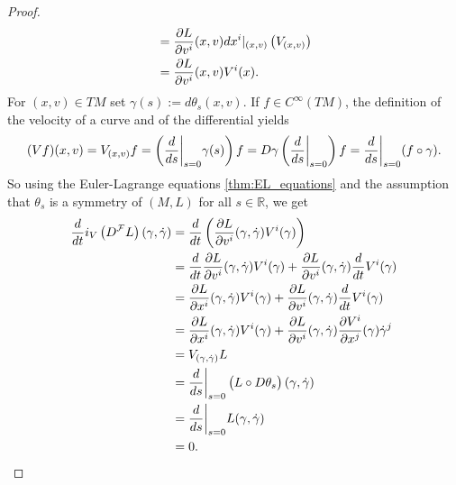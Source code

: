 \begin{proof}
\begin{align*}
		&= \frac{\partial L}{\partial v^i}(x,v)dx^i\vert_{(x,v)}\del[1]{V_{(x,v)}}\\
		&= \frac{\partial L}{\partial v^i}(x,v) V^i(x).
	\end{align*}
	For $(x,v) \in TM$ set $\gamma(s) := d\theta_s(x,v)$. If $f \in C^\infty(TM)$, the definition of the velocity of a curve and of the differential yields
	\begin{equation*}
		(Vf)(x,v) = V_{(x,v)}f = \del[3]{\frac{d}{ds}\bigg\vert_{s = 0}\gamma(s)}f= D\gamma\del[3]{\frac{d}{ds}\bigg\vert_{s = 0}}f = \frac{d}{ds}\bigg\vert_{s = 0}(f \circ \gamma).
	\end{equation*}
	So using the Euler-Lagrange equations \ref{thm:EL_equations} and the assumption that $\theta_s$ is a symmetry of $(M,L)$ for all $s \in \mathbb{R}$, we get
	\begin{align*}
		\frac{d}{dt}i_V\del[1]{D^\mathcal{F}L}(\gamma,\dot{\gamma}) &= \frac{d}{dt}\del[3]{\frac{\partial L}{\partial v^i}(\gamma,\dot{\gamma}) V^i(\gamma)}\\
		&= \frac{d}{dt}\frac{\partial L}{\partial v^i}(\gamma,\dot{\gamma}) V^i(\gamma) + \frac{\partial L}{\partial v^i}(\gamma,\dot{\gamma}) \frac{d}{dt}V^i(\gamma)\\
		&= \frac{\partial L}{\partial x^i}(\gamma,\dot{\gamma}) V^i(\gamma) + \frac{\partial L}{\partial v^i}(\gamma,\dot{\gamma}) \frac{d}{dt}V^i(\gamma)\\
		&= \frac{\partial L}{\partial x^i}(\gamma,\dot{\gamma}) V^i(\gamma) + \frac{\partial L}{\partial v^i}(\gamma,\dot{\gamma}) \frac{\partial V^i}{\partial x^j}(\gamma)\dot{\gamma}^j\\
		&= V_{(\gamma,\dot{\gamma})}L\\
		&= \frac{d}{ds}\bigg\vert_{s = 0} \del[1]{L \circ D\theta_s}(\gamma,\dot{\gamma})\\
		&= \frac{d}{ds}\bigg\vert_{s = 0} L(\gamma,\dot{\gamma})\\
		&= 0.
	\end{align*}
\end{proof}

